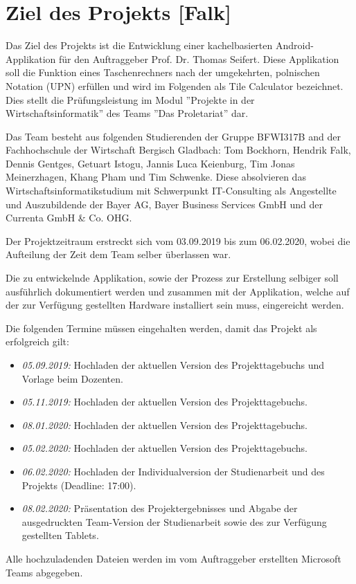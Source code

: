 \section{Ziel des Projekts [Falk]}

Das Ziel des Projekts ist die Entwicklung einer kachelbasierten Android-Applikation für den Auftraggeber Prof. Dr. Thomas Seifert. Diese Applikation soll die Funktion eines Taschenrechners nach der umgekehrten, polnischen Notation (UPN) erfüllen und wird im Folgenden als Tile Calculator bezeichnet. Dies stellt die Prüfungsleistung im Modul ''Projekte in der Wirtschaftsinformatik'' des Teams ''Das Proletariat'' dar. 

Das Team besteht aus folgenden Studierenden der Gruppe BFWI317B and der Fachhochschule der Wirtschaft Bergisch Gladbach: Tom Bockhorn, Hendrik Falk, Dennis Gentges, Getuart Istogu, Jannis Luca Keienburg, Tim Jonas Meinerzhagen, Khang Pham und Tim Schwenke. Diese absolvieren das Wirtschaftsinformatikstudium mit Schwerpunkt IT-Consulting als Angestellte und Auszubildende der Bayer AG, Bayer Business Services GmbH und der Currenta GmbH \& Co. OHG.

Der Projektzeitraum erstreckt sich vom 03.09.2019 bis zum 06.02.2020, wobei die Aufteilung der Zeit dem Team selber überlassen war.

Die zu entwickelnde Applikation, sowie der Prozess zur Erstellung selbiger soll ausführlich dokumentiert werden und zusammen mit der Applikation, welche auf der zur Verfügung gestellten Hardware installiert sein muss, eingereicht werden. 

Die folgenden Termine müssen eingehalten werden, damit das Projekt als erfolgreich gilt: 

\begin{itemize}
	\item \textit{05.09.2019:} Hochladen der aktuellen Version des Projekttagebuchs und Vorlage beim Dozenten.
	\item \textit{05.11.2019:} Hochladen der aktuellen Version des Projekttagebuchs.
	\item \textit{08.01.2020:} Hochladen der aktuellen Version des Projekttagebuchs.
	\item \textit{05.02.2020:} Hochladen der aktuellen Version des Projekttagebuchs.
	\item \textit{06.02.2020:} Hochladen der Individualversion der Studienarbeit und des Projekts (Deadline: 17:00).
	\item \textit{08.02.2020:} Präsentation des Projektergebnisses und Abgabe der ausgedruckten Team-Version der Studienarbeit sowie des zur Verfügung gestellten Tablets.
\end{itemize}

Alle hochzuladenden Dateien werden im vom Auftraggeber erstellten Microsoft Teams abgegeben.